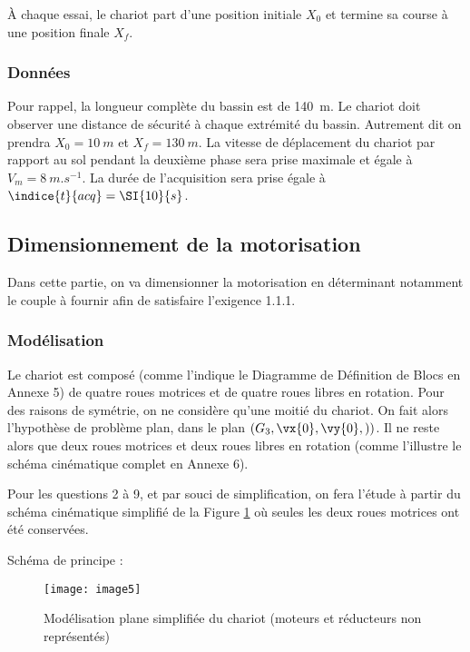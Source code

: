 À chaque essai, le chariot part d'une position initiale $X_0$ et termine sa course à une position finale $X_f$.
\subsubsection*{Données}
Pour rappel, la longueur complète du bassin est de \SI{140}{m}. Le chariot doit observer une distance de sécurité à chaque extrémité du bassin. Autrement dit on prendra $X_0=\SI{10}{m}$ et $X_f=\SI{130}{m}$.
La vitesse de déplacement du chariot par rapport au sol pendant la deuxième phase sera prise maximale et égale à $V_m=\SI{8}{m.s^{-1}}$. La durée de l'acquisition sera prise égale à $\indice{t}{acq}=\SI{10}{s}$.


\ifprof
\begin{corrige}
\end{corrige}
\else
\fi

\subsection{Dimensionnement de la motorisation}
Dans cette partie, on va dimensionner la motorisation en déterminant notamment le couple à fournir afin de satisfaire l’exigence 1.1.1.
\subsubsection{Modélisation}
Le chariot est composé (comme l'indique le Diagramme de Définition de Blocs en Annexe 5) de quatre roues motrices et de quatre roues libres en rotation. Pour des raisons de symétrie, on ne considère qu'une moitié du chariot. On fait alors l’hypothèse de problème plan, dans le plan $\left(G_3,\vx{0},\vy{0}, )\right)$. Il ne reste alors que deux roues motrices et deux roues libres en rotation (comme l’illustre le schéma cinématique complet en Annexe 6).

Pour les questions 2 à 9, et par souci de simplification, on fera l'étude à partir du schéma cinématique simplifié de la Figure \ref{fig:CCMP:2021:05} où seules les deux roues motrices ont été conservées.

Schéma de principe : 
\begin{figure}[!h]
\centering
\texttt{[image: image5]}
\caption{ \label{fig:CCMP:2021:05} Modélisation plane simplifiée du chariot (moteurs et réducteurs non représentés)}
\end{figure} 

